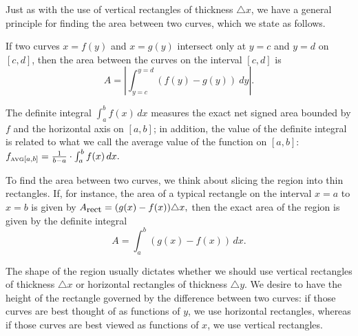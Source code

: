 Just as with the use of vertical rectangles of thickness $\triangle x$, we have a general principle for finding the area between two curves, which we state as follows.

{If two curves $x = f(y)$ and $x = g(y)$ intersect only at $y=c$ and $y=d$ on $[c,d]$, then the area between the curves on the interval $[c,d]$ is 
\[ A = \left| \int_{y=c}^{y=d} (f(y) - g(y)) \ dy \right|. \]
} %



\begin{summary}
\item The definite integral $\int_a^b f(x) \,dx$ measures the exact net signed area bounded by $f$ and the horizontal axis on $[a,b]$; in addition, the value of the definite integral is related to what we call the average value of the function on $[a,b]$: $f_{\mbox{\tiny{AVG}}[a,b]} = \frac{1}{b-a} \cdot \int_a^b f(x) \, dx.$  

\item To find the area between two curves, we think about slicing the region into thin rectangles.  If, for instance, the area of a typical rectangle on the interval $x = a$ to $x = b$ is given by $A_{\mbox{\small{rect}}} = (g(x) - f(x)) \triangle x,$ then the exact area of the region is given by the definite integral
\[ A = \int_a^b (g(x)-f(x))\, dx. \]

\item The shape of the region usually dictates whether we should use vertical rectangles of thickness $\triangle x$ or horizontal rectangles of thickness $\triangle y$.  We desire to have the height of the rectangle governed by the difference between two curves:  if those curves are best thought of as functions of $y$, we use horizontal rectangles, whereas if those curves are best viewed as functions of $x$, we use vertical rectangles.
\end{summary}

 

\cleardoublepage